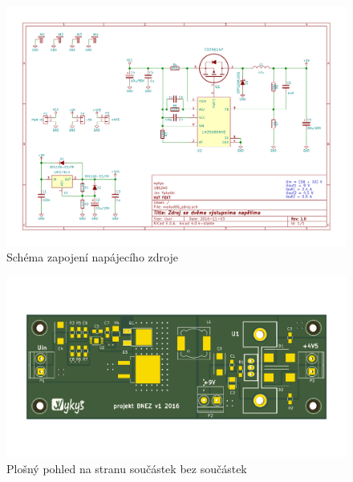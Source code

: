 \begin{landscape}	
	\begin{figure}[h]
		\centering 	
		\includegraphics[height=\textwidth]{../design/xvykyd06_zdroj.pdf}
		\caption{Schéma zapojení napájecího zdroje}	
	\end{figure}
\end{landscape}
\restoregeometry


\begin{figure}[H]
	\centering 	
	\includegraphics[width=\textwidth]{../design/img/xvykyd06_zdroj_6.png}
	\caption{Plošný pohled na stranu součástek bez součástek}	
\end{figure}



